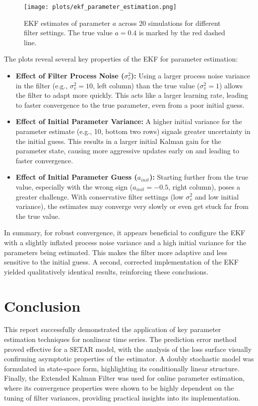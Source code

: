 \documentclass[11pt, a4paper]{article}
\begin{document}
\begin{figure}[H]
    \centering
    \texttt{[image: plots/ekf\_parameter\_estimation.png]}
    \caption{EKF estimates of parameter $a$ across 20 simulations for different filter settings. The true value $a=0.4$ is marked by the red dashed line.}
    \label{fig:ekf_results}
\end{figure}

The plots reveal several key properties of the EKF for parameter estimation:
\begin{itemize}
    \item \textbf{Effect of Filter Process Noise ($\sigma_v^2$):} Using a larger process noise variance in the filter (e.g., $\sigma_v^2=10$, left column) than the true value ($\sigma_v^2=1$) allows the filter to adapt more quickly. This acts like a larger learning rate, leading to faster convergence to the true parameter, even from a poor initial guess.
    \item \textbf{Effect of Initial Parameter Variance:} A higher initial variance for the parameter estimate (e.g., 10, bottom two rows) signals greater uncertainty in the initial guess. This results in a larger initial Kalman gain for the parameter state, causing more aggressive updates early on and leading to faster convergence.
    \item \textbf{Effect of Initial Parameter Guess ($a_{init}$):} Starting further from the true value, especially with the wrong sign ($a_{init}=-0.5$, right column), poses a greater challenge. With conservative filter settings (low $\sigma_v^2$ and low initial variance), the estimates may converge very slowly or even get stuck far from the true value.
\end{itemize}

In summary, for robust convergence, it appears beneficial to configure the EKF with a slightly inflated process noise variance and a high initial variance for the parameters being estimated. This makes the filter more adaptive and less sensitive to the initial guess. A second, corrected implementation of the EKF yielded qualitatively identical results, reinforcing these conclusions.

\section{Conclusion}
This report successfully demonstrated the application of key parameter estimation techniques for nonlinear time series. The prediction error method proved effective for a SETAR model, with the analysis of the loss surface visually confirming asymptotic properties of the estimator. A doubly stochastic model was formulated in state-space form, highlighting its conditionally linear structure. Finally, the Extended Kalman Filter was used for online parameter estimation, where its convergence properties were shown to be highly dependent on the tuning of filter variances, providing practical insights into its implementation.



\end{document}
